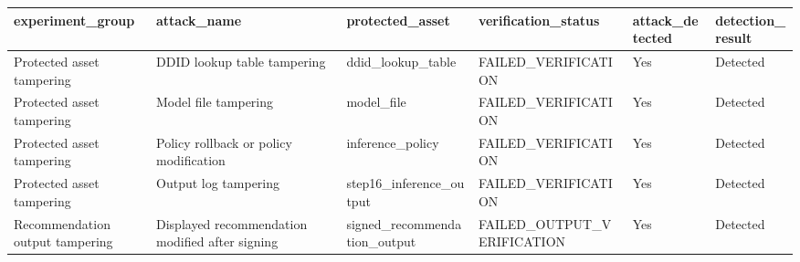 \begin{tabular}{llllll}
\toprule
experiment\_group & attack\_name & protected\_asset & verification\_status & attack\_detected & detection\_result \\
\midrule
Protected asset tampering & DDID lookup table tampering & ddid\_lookup\_table & FAILED\_VERIFICATION & Yes & Detected \\
Protected asset tampering & Model file tampering & model\_file & FAILED\_VERIFICATION & Yes & Detected \\
Protected asset tampering & Policy rollback or policy modification & inference\_policy & FAILED\_VERIFICATION & Yes & Detected \\
Protected asset tampering & Output log tampering & step16\_inference\_output & FAILED\_VERIFICATION & Yes & Detected \\
Recommendation output tampering & Displayed recommendation modified after signing & signed\_recommendation\_output & FAILED\_OUTPUT\_VERIFICATION & Yes & Detected \\
\bottomrule
\end{tabular}
